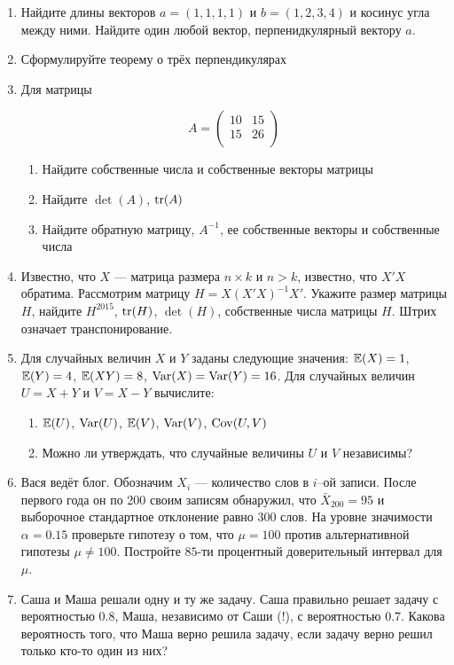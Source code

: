 \documentclass[12pt, a4paper]{article}
\begin{document}
\begin{enumerate}
\item Найдите длины векторов $a=(1,1,1,1)$ и $b=(1,2,3,4)$ и косинус угла между ними. Найдите один любой вектор, перпенидкулярный вектору $a$.
\item Сформулируйте теорему о трёх перпендикулярах
\item Для матрицы

\[
A=\begin{pmatrix}
10 & 15 \\
15 & 26 \\
\end{pmatrix}
\]

\begin{enumerate}
\item Найдите собственные числа и собственные векторы матрицы
\item Найдите $\det (A)$, $\operatorname{tr}(A)$
\item Найдите обратную матрицу, $A^{-1}$, ее собственные векторы и собственные числа
\end{enumerate}

\item Известно, что $X$ — матрица размера $n \times k$ и $n>k$, известно, что $X'X$ обратима. Рассмотрим матрицу $H=X(X'X)^{-1}X'$. Укажите размер матрицы $H$, найдите $H^{2015}$, $\operatorname{tr}(H)$, $\det(H)$, собственные числа матрицы $H$. Штрих означает транспонирование.

\item Для случайных величин $X$ и $Y$ заданы следующие значения: $\mathbb{E}(X)=1$, $\mathbb{E}(Y)=4$, $\mathbb{E}(XY)=8$, $\operatorname{Var}(X)=\operatorname{Var}(Y)=16$. Для случайных величин $U=X+Y$ и $V=X-Y$ вычислите:
\begin{enumerate}
\item $\mathbb{E}(U)$, $\operatorname{Var}(U)$, $\mathbb{E}(V)$, $\operatorname{Var}(V)$, $\operatorname{Cov}(U,V)$
\item Можно ли утверждать, что случайные величины $U$ и $V$ независимы?
\end{enumerate}

\item Вася ведёт блог. Обозначим $X_i$ — количество слов в $i$--ой записи. После первого года он по 200 своим записям обнаружил, что $\bar{X}_{200}=95$ и выборочное стандартное отклонение равно $300$ слов. На уровне значимости $\alpha=0.15$ проверьте гипотезу о том, что $\mu=100$ против альтернативной гипотезы $\mu\neq 100$. Постройте $85$-ти процентный доверительный интервал для $\mu$.

\item Саша и Маша решали одну и ту же задачу. Саша правильно решает задачу с вероятностью $0.8$, Маша, независимо от Саши (!), с вероятностью $0.7$. Какова вероятность того, что Маша верно решила задачу, если задачу верно решил только кто-то один из них?

\end{enumerate}
\end{document}
